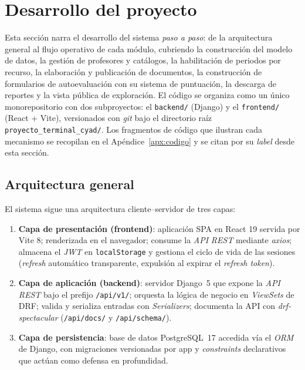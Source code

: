 \section{Desarrollo del proyecto}\label{sec:desarrollo}
\justifying

Esta sección narra el desarrollo del sistema \emph{paso a paso}: de la arquitectura general al flujo operativo de cada módulo, cubriendo la construcción del modelo de datos, la gestión de profesores y catálogos, la habilitación de periodos por recurso, la elaboración y publicación de documentos, la construcción de formularios de autoevaluación con su sistema de puntuación, la descarga de reportes y la vista pública de exploración. El código se organiza como un único monorepositorio con dos subproyectos: el \texttt{backend/} (Django) y el \texttt{frontend/} (React + Vite), versionados con \emph{git} bajo el directorio raíz \texttt{proyecto\_terminal\_cyad/}. Los fragmentos de código que ilustran cada mecanismo se recopilan en el Apéndice~\ref{apx:codigo} y se citan por su \emph{label} desde esta sección.

\subsection{Arquitectura general}

El sistema sigue una arquitectura cliente--servidor de tres capas:

\begin{enumerate}
    \item \textbf{Capa de presentación (frontend)}: aplicación SPA en React 19 servida por Vite 8; renderizada en el navegador; consume la \emph{API} \emph{REST} mediante \emph{axios}; almacena el \emph{JWT} en \texttt{localStorage} y gestiona el ciclo de vida de las sesiones (\emph{refresh} automático transparente, expulsión al expirar el \emph{refresh token}).
    \item \textbf{Capa de aplicación (backend)}: servidor Django~5 que expone la \emph{API} \emph{REST} bajo el prefijo \texttt{/api/v1/}; orquesta la lógica de negocio en \emph{ViewSets} de DRF; valida y serializa entradas con \emph{Serializers}; documenta la API con \emph{drf-spectacular} (\texttt{/api/docs/} y \texttt{/api/schema/}).
    \item \textbf{Capa de persistencia}: base de datos PostgreSQL~17 accedida vía el \emph{ORM} de Django, con migraciones versionadas por app y \emph{constraints} declarativos que actúan como defensa en profundidad.
\end{enumerate}

